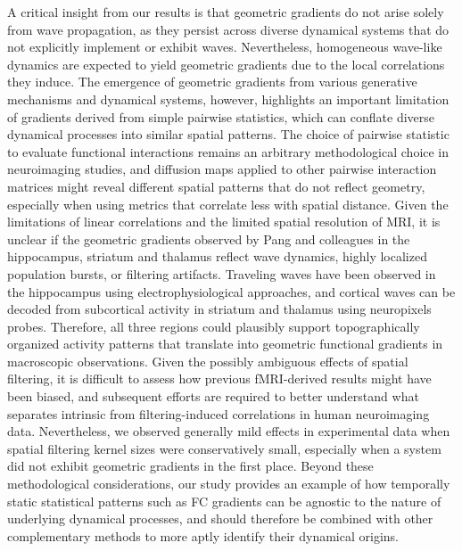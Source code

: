 \documentclass{article}
\begin{document}
A critical insight from our results is that geometric gradients do not arise solely from wave propagation, as they persist across diverse dynamical systems that do not explicitly implement or exhibit waves. Nevertheless, homogeneous wave-like dynamics are expected to yield geometric gradients due to the local correlations they induce\cite{ackman2012retinal}. The emergence of geometric gradients from various generative mechanisms and dynamical systems, however, highlights an important limitation of gradients derived from simple pairwise statistics, which can conflate diverse dynamical processes into similar spatial patterns. The choice of pairwise statistic to evaluate functional interactions remains an arbitrary methodological choice in neuroimaging studies, and diffusion maps applied to other pairwise interaction matrices might reveal different spatial patterns that do not reflect geometry, especially when using metrics that correlate less with spatial distance\cite{liu2024benchmarking}. Given the limitations of linear correlations and the limited spatial resolution of MRI, it is unclear if the geometric gradients observed by Pang and colleagues\cite{pang2023geometric} in the hippocampus, striatum and thalamus reflect wave dynamics, highly localized population bursts, or filtering artifacts. Traveling waves have been observed in the hippocampus using electrophysiological approaches\cite{lubenov2009hippocampal, patel2012traveling}, and cortical waves can be decoded from subcortical activity in striatum and thalamus using neuropixels probes\cite{ye2023brain}. Therefore, all three regions could plausibly support topographically organized activity patterns that translate into geometric functional gradients in macroscopic observations. Given the possibly ambiguous effects of spatial filtering, it is difficult to assess how previous fMRI-derived results might have been biased, and subsequent efforts are required to better understand what separates intrinsic from filtering-induced correlations in human neuroimaging data. Nevertheless, we observed generally mild effects in experimental data when spatial filtering kernel sizes were conservatively small, especially when a system did not exhibit geometric gradients in the first place. Beyond these methodological considerations, our study provides an example of how temporally static statistical patterns such as FC gradients can be agnostic to the nature of underlying dynamical processes, and should therefore be combined with other complementary methods to more aptly identify their dynamical origins.
\end{document}

